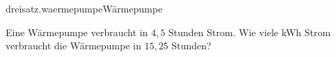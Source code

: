 \begin{exercise}{dreisatz.waermepumpe}{Wärmepumpe}
  \ifproblem\problem\par
    Eine Wärmepumpe verbraucht in $4,\!5$ Stunden  Strom. Wie viele kWh
    Strom verbraucht die Wärmepumpe in $15,\!25$ Stunden?
  \fi
\end{exercise}
